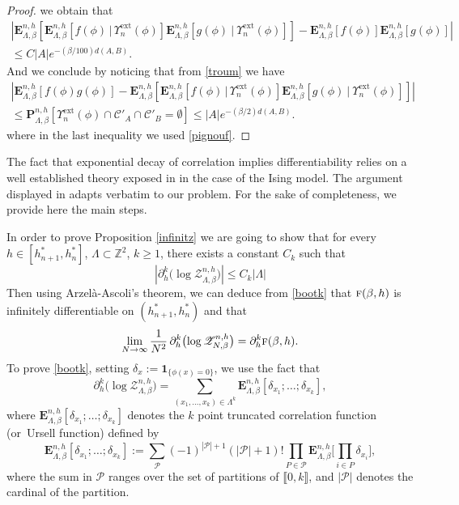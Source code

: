 \documentclass[10pt]{amsart}
\let\mathcal\mathscr
\numberwithin{equation}{section}
\theoremstyle{plain}
\theoremstyle{definition}
\newcommand{\ext}{\mathrm{ext}}
\newcommand{\lint}{\llbracket}
\newcommand{\rint}{\rrbracket}
\newcommand{\ind}{\mathbf{1}}
\newcommand{\cP}{{\ensuremath{\mathcal P}} }
\newcommand{\cC}{{\ensuremath{\mathcal C}} }
\newcommand{\cZ}{{\ensuremath{\mathcal Z}} }
\newcommand{\bP}{{\ensuremath{\mathbf P}} }
\newcommand{\bE}{{\ensuremath{\mathbf E}} }
\newcommand{\bbZ}{{\ensuremath{\mathbb Z}} }
\newcommand{\gb}{\beta}
\newcommand{\gL}{\Lambda}
\newcommand{\tf}{\textsc{f}}
\begin{document}
\begin{proof}
we obtain that
\begin{multline*}
\left| \bE^{n,h}_{\gL,\gb}\left[ \bE^{n,h}_{\gL,\gb}[f(\phi) \, | \, \Upsilon^{\ext}_n(\phi)] \bE^{n,h}_{\gL,\gb}[g(\phi) \ | \
\Upsilon^{\ext}_n(\phi)]\right] - \bE^{n,h}_{\gL,\gb}[f(\phi)] \bE^{n,h}_{\gL,\gb}[g(\phi)] \right|
\\ \le C|A|e^{-(\gb/100) d(A,B)}.
\end{multline*}
And we conclude by noticing that from \eqref{troum} we have
\begin{multline*}
\left| \bE^{n,h}_{\gL,\gb}[f(\phi)g(\phi)]- \bE^{n,h}_{\gL,\gb}\left[ \bE^{n,h}_{\gL,\gb}[f(\phi) \, | \, \Upsilon^{\ext}_n(\phi)] \bE^{n,h}_{\gL,\gb}[g(\phi) \ | \
\Upsilon^{\ext}_n(\phi)]\right]\right|\\ \le
\bP^{n,h}_{\gL,\gb}[\Upsilon^{\ext}_n(\phi)\cap \cC'_A \cap \cC'_B=\emptyset]\le |A|e^{-(\gb/2) d(A,B)}.
\end{multline*}
where in the last inequality we used \eqref{pignouf}.
\end{proof}

\label{laprov}

The fact that exponential decay of correlation implies differentiability relies
on a well established theory exposed \eg in \cite{cf:vDK} in the case of the Ising model.
The argument displayed in \cite{cf:vDK} adapts verbatim to our problem.
For the sake of completeness, we provide here the main steps.

In order to prove Proposition \ref{infinitz} we are going to show that
for every $h\in [h^*_{n+1},h^*_n]$, $\gL\subset \bbZ^2$, $k\ge 1$, there exists a constant $C_k$ such that
\begin{equation}\label{bootk}
\left|\partial^k_h\bigl(\log \cZ^{n,h}_{\gL,\gb}\bigr)\right|\le C_k |\gL|
\end{equation}
Then using Arzelà-Ascoli's theorem,
we can deduce from \eqref{bootk} that $\tf(\gb,h)$ is infinitely differentiable on $(h^*_{n+1},h^*_n)$ and that
\begin{equation}\label{koomits}
\lim_{N\to \infty}\frac{1}{N^2}\,\partial^k_h\bigl(\log \cZ^{n,h}_{N,\gb}\bigr)= \partial^k_h \tf(\gb,h).
\end{equation}
To prove \eqref{bootk}, setting $\delta_x:=\ind_{\{\phi(x)=0\}}$, we use the fact that
\begin{equation}\label{mood}
\partial^k_h\bigl(\log \cZ^{n,h}_{\gL,\gb}\bigr)= \sum_{(x_1,\dots,x_k)\in \gL^k} \bE^{n,h}_{\gL,\gb}\left[ \delta_{x_1} ; \dots ; \delta_{x_k} \right],
\end{equation}
where $\bE^{n,h}_{\gL,\gb}\left[ \delta_{x_1} ; \dots ; \delta_{x_k} \right]$ denotes the $k$ point truncated correlation function (or~Ursell function)
defined by
\begin{equation*}
\bE^{n,h}_{\gL,\gb}\left[ \delta_{x_1} ; \dots ; \delta_{x_k} \right]:=
\sum_{\cP} (-1)^{|\cP|+1}(|\cP|+1)! \prod_{P\in \cP}\bE^{n,h}_{\gL,\gb}\biggl[\prod_{i \in P} \delta_{x_i}\biggr],
\end{equation*}
where the sum in $\cP$ ranges over the set of partitions of $\lint 0,k \rint$, and $|\cP|$ denotes the cardinal of the partition.
\end{document}
